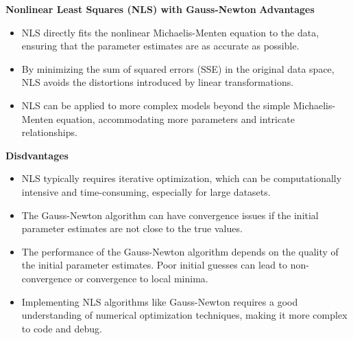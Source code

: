 \documentclass{article} %
\theoremstyle{definition}
\theoremstyle{remark}
\theoremstyle{plain}
\begin{document}
\textbf{Nonlinear Least Squares (NLS) with Gauss-Newton}
\textbf{Advantages}
\begin{itemize}[label={--}]
    \item NLS directly fits the nonlinear Michaelis-Menten equation to the data, ensuring that the parameter estimates are as accurate as possible.
    \item By minimizing the sum of squared errors (SSE) in the original data space, NLS avoids the distortions introduced by linear transformations.
    \item NLS can be applied to more complex models beyond the simple Michaelis-Menten equation, accommodating more parameters and intricate relationships.
\end{itemize}
\textbf{Disdvantages}
\begin{itemize}[label={--}]
    \item NLS typically requires iterative optimization, which can be computationally intensive and time-consuming, especially for large datasets.
    \item The Gauss-Newton algorithm can have convergence issues if the initial parameter estimates are not close to the true values.
    \item The performance of the Gauss-Newton algorithm depends on the quality of the initial parameter estimates. Poor initial guesses can lead to non-convergence or convergence to local minima.
    \item  Implementing NLS algorithms like Gauss-Newton requires a good understanding of numerical optimization techniques, making it more complex to code and debug.
\end{itemize}
\end{document}
